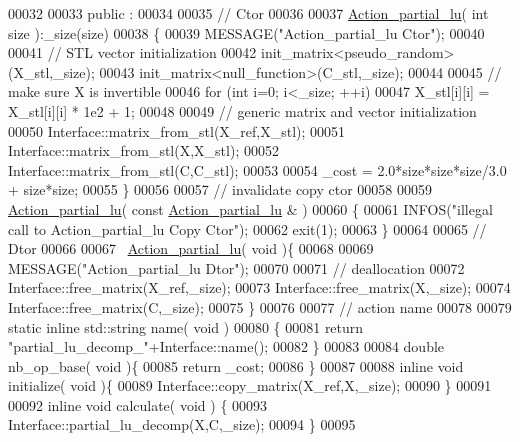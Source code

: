 \begin{DoxyCode}
00032 
00033 public :
00034 
00035   \textcolor{comment}{// Ctor}
00036 
00037   \hyperlink{class_action__partial__lu}{Action\_partial\_lu}( \textcolor{keywordtype}{int} size ):\_size(size)
00038   \{
00039     MESSAGE(\textcolor{stringliteral}{"Action\_partial\_lu Ctor"});
00040 
00041     \textcolor{comment}{// STL vector initialization}
00042     init\_matrix<pseudo\_random>(X\_stl,\_size);
00043     init\_matrix<null\_function>(C\_stl,\_size);
00044 
00045     \textcolor{comment}{// make sure X is invertible}
00046     \textcolor{keywordflow}{for} (\textcolor{keywordtype}{int} i=0; i<\_size; ++i)
00047       X\_stl[i][i] = X\_stl[i][i] * 1e2 + 1;
00048 
00049     \textcolor{comment}{// generic matrix and vector initialization}
00050     Interface::matrix\_from\_stl(X\_ref,X\_stl);
00051     Interface::matrix\_from\_stl(X,X\_stl);
00052     Interface::matrix\_from\_stl(C,C\_stl);
00053 
00054     \_cost = 2.0*size*size*size/3.0 + size*size;
00055   \}
00056 
00057   \textcolor{comment}{// invalidate copy ctor}
00058 
00059   \hyperlink{class_action__partial__lu}{Action\_partial\_lu}( \textcolor{keyword}{const}  \hyperlink{class_action__partial__lu}{Action\_partial\_lu} & )
00060   \{
00061     INFOS(\textcolor{stringliteral}{"illegal call to Action\_partial\_lu Copy Ctor"});
00062     exit(1);
00063   \}
00064 
00065   \textcolor{comment}{// Dtor}
00066 
00067   ~\hyperlink{class_action__partial__lu}{Action\_partial\_lu}( \textcolor{keywordtype}{void} )\{
00068 
00069     MESSAGE(\textcolor{stringliteral}{"Action\_partial\_lu Dtor"});
00070 
00071     \textcolor{comment}{// deallocation}
00072     Interface::free\_matrix(X\_ref,\_size);
00073     Interface::free\_matrix(X,\_size);
00074     Interface::free\_matrix(C,\_size);
00075   \}
00076 
00077   \textcolor{comment}{// action name}
00078 
00079   \textcolor{keyword}{static} \textcolor{keyword}{inline} std::string name( \textcolor{keywordtype}{void} )
00080   \{
00081     \textcolor{keywordflow}{return} \textcolor{stringliteral}{"partial\_lu\_decomp\_"}+Interface::name();
00082   \}
00083 
00084   \textcolor{keywordtype}{double} nb\_op\_base( \textcolor{keywordtype}{void} )\{
00085     \textcolor{keywordflow}{return} \_cost;
00086   \}
00087 
00088   \textcolor{keyword}{inline} \textcolor{keywordtype}{void} initialize( \textcolor{keywordtype}{void} )\{
00089     Interface::copy\_matrix(X\_ref,X,\_size);
00090   \}
00091 
00092   \textcolor{keyword}{inline} \textcolor{keywordtype}{void} calculate( \textcolor{keywordtype}{void} ) \{
00093       Interface::partial\_lu\_decomp(X,C,\_size);
00094   \}
00095 

\end{DoxyCode}
